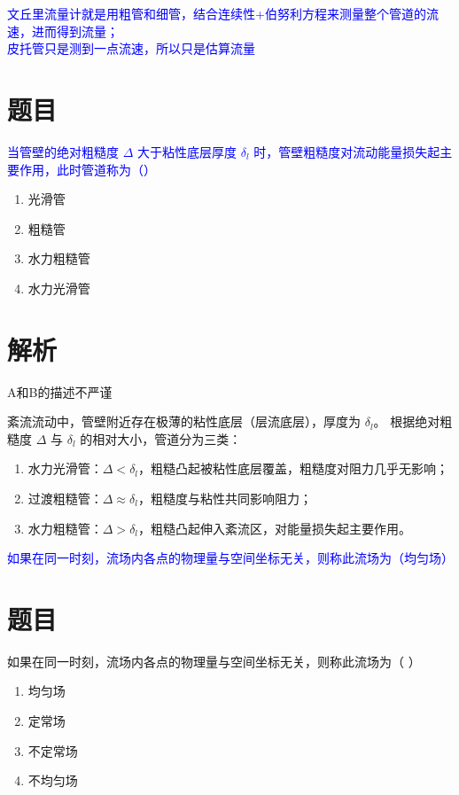 \documentclass[11pt,a4paper]{article}
\begin{document}
\textcolor{blue}{文丘里流量计就是用粗管和细管，结合连续性+伯努利方程来测量整个管道的流速，进而得到流量；\\皮托管只是测到一点流速，所以只是估算流量}


\section*{题目}
\textcolor{blue}{当管壁的绝对粗糙度 $\Delta$ 大于粘性底层厚度 $\delta_l$ 时，管壁粗糙度对流动能量损失起主要作用，此时管道称为（）}
\begin{enumerate}
    \item[A] 光滑管
    \item[B] 粗糙管
    \item[C] 水力粗糙管
    \item[D] 水力光滑管
\end{enumerate}

\section*{解析}
A和B的描述不严谨

紊流流动中，管壁附近存在极薄的粘性底层（层流底层），厚度为 $\delta_l$。
根据绝对粗糙度 $\Delta$ 与 $\delta_l$ 的相对大小，管道分为三类：
\begin{enumerate}
    \item 水力光滑管：$\Delta < \delta_l$，粗糙凸起被粘性底层覆盖，粗糙度对阻力几乎无影响；
    \item 过渡粗糙管：$\Delta \approx \delta_l$，粗糙度与粘性共同影响阻力；
    \item 水力粗糙管：$\Delta > \delta_l$，粗糙凸起伸入紊流区，对能量损失起主要作用。
\end{enumerate}

\vspace{2em}
\textcolor{blue}{如果在同一时刻，流场内各点的物理量与空间坐标无关，则称此流场为（均匀场）}


\section*{题目}
如果在同一时刻，流场内各点的物理量与空间坐标无关，则称此流场为（ ）
\begin{enumerate}
    \item[A] 均匀场
    \item[B] 定常场
    \item[C] 不定常场
    \item[D] 不均匀场
\end{enumerate}
\end{document}
